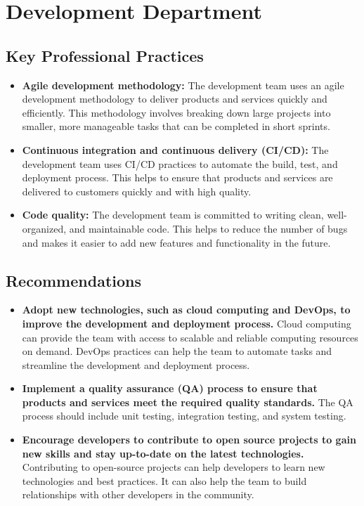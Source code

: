 \documentclass{article}
\begin{document}
\hfill \break
\hfill \break
\hfill \break

\section{Development Department}

\subsection{Key Professional Practices}

\begin{itemize}
  \item \textbf{Agile development methodology:} The development team uses an agile development methodology to deliver products and services quickly and efficiently. This methodology involves breaking down large projects into smaller, more manageable tasks that can be completed in short sprints.
  \item \textbf{Continuous integration and continuous delivery (CI/CD):} The development team uses CI/CD practices to automate the build, test, and deployment process. This helps to ensure that products and services are delivered to customers quickly and with high quality.
  \item \textbf{Code quality:} The development team is committed to writing clean, well-organized, and maintainable code. This helps to reduce the number of bugs and makes it easier to add new features and functionality in the future.
\end{itemize}

\subsection{Recommendations}

\begin{itemize}
  \item \textbf{Adopt new technologies, such as cloud computing and DevOps, to improve the development and deployment process.} Cloud computing can provide the team with access to scalable and reliable computing resources on demand. DevOps practices can help the team to automate tasks and streamline the development and deployment process.
  \item \textbf{Implement a quality assurance (QA) process to ensure that products and services meet the required quality standards.} The QA process should include unit testing, integration testing, and system testing.
  \item \textbf{Encourage developers to contribute to open source projects to gain new skills and stay up-to-date on the latest technologies.} Contributing to open-source projects can help developers to learn new technologies and best practices. It can also help the team to build relationships with other developers in the community.
\end{itemize}
\end{document}
